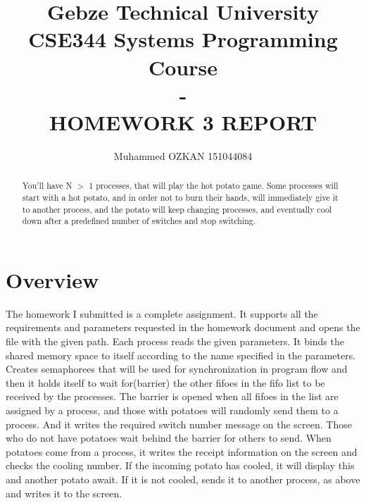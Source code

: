 \documentclass{article}
\begin{document}
\title{Gebze Technical University\\CSE344 Systems Programming Course\\ -\\HOMEWORK 3 REPORT}
\author{Muhammed OZKAN 151044084}

\maketitle

\begin{abstract}
You’ll have N $>$ 1 processes, that will play the hot potato game. Some processes will start with a hot potato, and in order not to burn their hands, will immediately give it to another process, and the potato will keep
changing processes, and eventually cool down after a predefined number of switches and stop switching.
\end{abstract}

\section{Overview}
\quad The homework I submitted is a complete assignment. It supports all the requirements and parameters requested in the homework document and opens the file with the given path. Each process reads the given parameters. It binds the shared memory space to itself according to the name specified in the parameters. Creates semaphorees that will be used for synchronization in program flow and then it holds itself to wait for(barrier) the other fifoes in the fifo list to be received by the processes. The barrier is opened when all fifoes in the list are assigned by a process, and those with potatoes will randomly send them to a process. And it writes the required switch number message  on the screen. Those who do not have potatoes wait behind the barrier for others to send. When potatoes come from a process, it writes the receipt information on the screen and checks the cooling number. If the incoming potato has cooled, it will display this and another potato await. If it is not cooled, sends it to another process, as above and writes it to the screen.\\
\newpage
\end{document}
